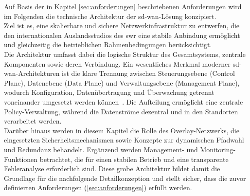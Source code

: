 
Auf Basis der in Kapitel \ref{sec:anforderungen} beschriebenen Anforderungen wird im Folgenden die technische Architektur der \ac{sd-wan}-Lösung konzipiert. \\
Ziel ist es, eine skalierbare und sichere Netzwerkinfrastruktur zu entwerfen, die den internationalen Auslandsstudios des \ac{swr} eine stabile Anbindung ermöglicht und gleichzeitig die betrieblichen Rahmenbedingungen berücksichtigt. \\
Die Architektur umfasst dabei die logische Struktur des Gesamtsystems, zentrale Komponenten sowie deren Verbindung. Ein wesentliches Merkmal moderner \ac{sd-wan}-Architekturen ist die klare Trennung zwischen Steuerungsebene (Control Plane), Datenebene (Data Plane) und Verwaltungsebene (Management Plane), wodurch Konfiguration, Datenübertragung und Überwachung getrennt voneinander umgesetzt werden können~\cite[1f]{rajagopalanOverviewSDWANLoad2020}. Die Aufteilung ermöglicht eine zentrale Policy-Verwaltung, während die Datenströme dezentral und in den Standorten verarbeitet werden. \\
Darüber hinaus werden in diesem Kapitel die Rolle des Overlay-Netzwerks, die eingesetzten Sicherheitsmechanismen sowie Konzepte zur dynamischen Pfadwahl und Redundanz behandelt. Ergänzend werden Management- und Monitoring-Funktionen betrachtet, die für einen stabilen Betrieb und eine transparente Fehleranalyse erforderlich sind. Diese grobe Architektur bildet damit die Grundlage für die nachfolgende Detailkonzeption und stellt sicher, dass die zuvor definierten Anforderungen (\ref{sec:anforderungen}) erfüllt werden.